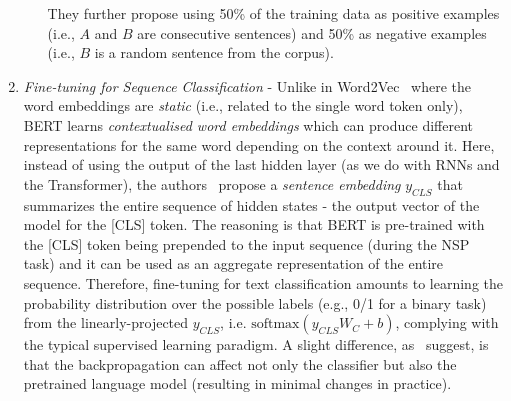 \begin{enumerate}
\begin{enumerate}
        They further propose using 50\% of the training data as positive examples (i.e., $A$ and $B$ are consecutive sentences) and 50\% as negative examples (i.e., $B$ is a random sentence from the corpus).
    \end{enumerate}
    \item \emph{Fine-tuning for Sequence Classification} - Unlike in Word2Vec~\cite{mikolov2013efficient} where the word embeddings are \emph{static} (i.e., related to the single word token only), BERT learns \emph{contextualised word embeddings} which can produce different representations for the same word depending on the context around it.
    Here, instead of using the output of the last hidden layer (as we do with RNNs and the Transformer), the authors~\cite{devlin-etal-2019-bert} propose a \emph{sentence embedding} $y_{CLS}$ that summarizes the entire sequence of hidden states - the output vector of the model for the [CLS] token.
    The reasoning is that BERT is pre-trained with the [CLS] token being prepended to the input sequence (during the NSP task) and it can be used as an aggregate representation of the entire sequence.
    Therefore, fine-tuning for text classification amounts to learning the probability distribution over the possible labels (e.g., 0/1 for a binary task) from the linearly-projected $y_{CLS}$, i.e. $\text{softmax}(y_{CLS}W_{C} + b)$, complying with the typical supervised learning paradigm.
    A slight difference, as~\cite{jurafsky2000} suggest, is that the backpropagation can affect not only the classifier but also the pretrained language model (resulting in minimal changes in practice).
\end{enumerate}

